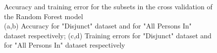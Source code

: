 \documentclass[conference]{IEEEtran}
\begin{document}

\begin{figure}[ht!]
    \centering

    \quad
    \quad
    
    \quad
    \quad

    \caption{
        \color{baptiste}
        Accuracy and training error for the subsets in the cross validation of the Random Forest model \\ 
        (a,b) Accuracy for "Disjunct" dataset and for "All Persons In" dataset respectively;
        (c,d) Training errors for "Disjunct" dataset and for "All Persons In" dataset respectively
    }
    \label{fig:hyper:cv_RF}
\end{figure}
\end{document}
